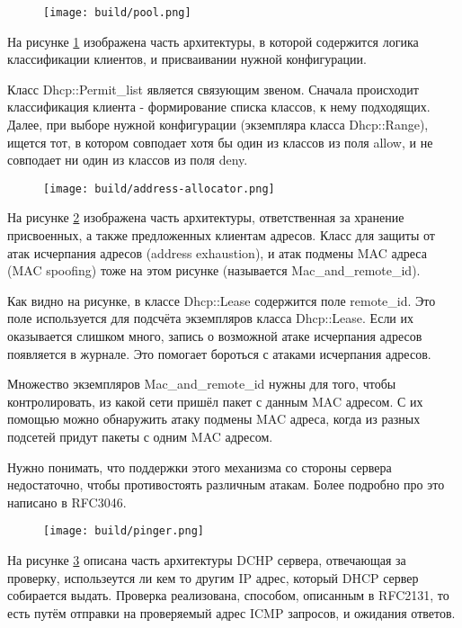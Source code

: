 \documentclass[14pt]{extarticle}
\begin{document}
\begin{figure}[H]
    \texttt{[image: build/pool.png]}
    \caption{}
    \label{fig:pool}
\end{figure}

На рисунке \ref{fig:pool} изображена часть архитектуры, в которой содержится логика классификации клиентов, и присваивании нужной конфигурации.

Класс Dhcp::Permit\_list является связующим звеном.
Сначала происходит классификация клиента - формирование списка классов, к нему подходящих.
Далее, при выборе нужной конфигурации (экземпляра класса Dhcp::Range), ищется тот, в котором совподает хотя бы один из классов из поля allow, и не совподает ни один из классов из поля deny.

\begin{figure}[H]
    \texttt{[image: build/address-allocator.png]}
    \caption{}
    \label{fig:address_allocator}
\end{figure}

На рисунке \ref{fig:address_allocator} изображена часть архитектуры, ответственная за хранение присвоенных, а также предложенных клиентам адресов.
Класс для защиты от атак исчерпания адресов (address exhaustion), и атак подмены MAC адреса (MAC spoofing) тоже на этом рисунке (называется Mac\_and\_remote\_id).

Как видно на рисунке, в классе Dhcp::Lease содержится поле remote\_id. Это поле используется для подсчёта экземпляров класса Dhcp::Lease. Если их оказывается слишком много, запись о возможной атаке исчерпания адресов появляется в журнале. Это помогает бороться с атаками исчерпания адресов.

Множество экземпляров Mac\_and\_remote\_id нужны для того, чтобы контролировать, из какой сети пришёл пакет с данным MAC адресом.
С их помощью можно обнаружить атаку подмены MAC адреса, когда из разных подсетей придут пакеты с одним MAC адресом.

Нужно понимать, что поддержки этого механизма со стороны сервера недостаточно, чтобы противостоять различным атакам. Более подробно про это написано в RFC3046.

\begin{figure}[H]
    \texttt{[image: build/pinger.png]}
    \caption{}
    \label{fig:pinger}
\end{figure}

На рисунке \ref{fig:pinger} описана часть архитектуры DCHP сервера, отвечающая за проверку, использеутся ли  кем то другим IP адрес, который DHCP сервер собирается выдать. Проверка реализована, способом, описанным в RFC2131, то есть путём отправки на проверяемый адрес ICMP запросов, и ожидания ответов.
\end{document}
